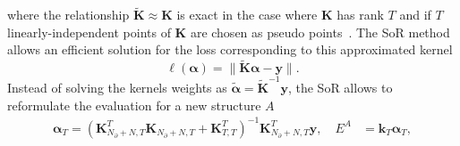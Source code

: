 where the relationship $\tilde{\mathbf{K}} \approx \mathbf{K}$ is exact in the case where $\mathbf{K}$ has rank $T$ and if $T$ linearly-independent points of $\mathbf{K}$ are chosen as pseudo points~\cite{williams2000using}.
The SoR method allows an efficient solution for the loss corresponding to this approximated kernel
\begin{equation}
\ell(\boldsymbol{\alpha}) = \| \tilde{\mathbf{K}}\boldsymbol{\alpha} - \mathbf{y} \|.
\end{equation}
Instead of solving the kernels weights as $\tilde{\boldsymbol{\alpha}} = \tilde{\mathbf{K}}^{-1}\mathbf{y}$, the SoR allows to reformulate the evaluation for a new structure $A$
\begin{subequations}
\begin{align}
  \boldsymbol{\alpha}_T = (\mathbf{K}_{N_{\partial}+N,T}^T\mathbf{K}_{N_{\partial}+N,T}^{\phantom{1}} + \mathbf{K}_{T,T}^T)^{-1}\mathbf{K}_{N_{\partial}+N,T}^T\mathbf{y},\quad E^A &= \mathbf{k}_{T}\boldsymbol{\alpha}_T, 
%  
\end{align}
\end{subequations}
